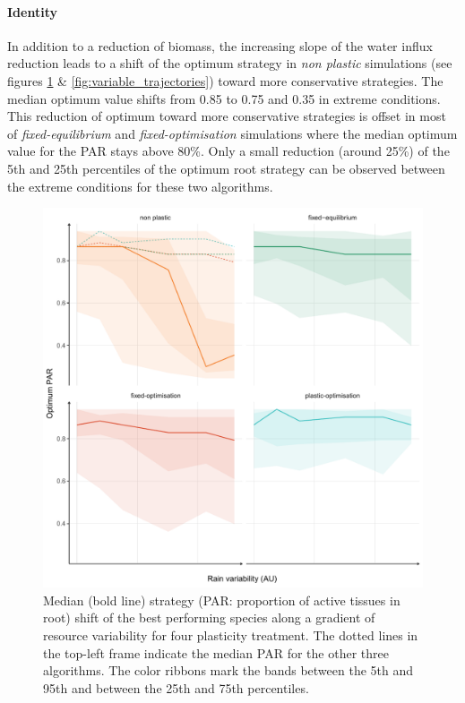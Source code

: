 \paragraph{Identity}

In addition to a reduction of biomass, the increasing slope of the water influx reduction leads to a shift of the optimum strategy in \textit{non plastic} simulations (see figures \ref{fig:variable_strategy} \&  \ref{fig:variable_trajectories}) toward more conservative strategies. The median optimum value shifts from 0.85 to 0.75 and 0.35 in extreme conditions. This reduction of optimum toward more conservative strategies is offset in most of \textit{fixed-equilibrium} and \textit{fixed-optimisation} simulations where the median optimum value for the PAR stays above 80\%. Only a small reduction (around 25\%) of the 5th and 25th percentiles of the optimum root strategy can be observed between the extreme conditions for these two algorithms.

\begin{figure}
\includegraphics[width = \textwidth]{./2_PP/Figures/Variable/var_strat_trend.pdf}
\caption[Strategy shift along a gradient of resource variability]{Median (bold line) strategy (PAR: proportion of active tissues in root) shift of the best performing species along a gradient of resource variability for four plasticity treatment. The dotted lines in the top-left frame indicate the median PAR for the other three algorithms. The color ribbons mark the bands between the 5th and 95th and between the 25th and 75th percentiles.}\label{fig:variable_strategy}
\end{figure}


